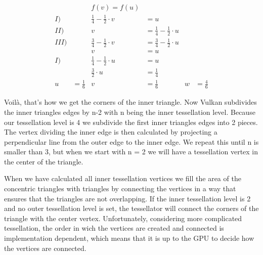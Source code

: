 \documentclass[12pt]{report} \usepackage{preamble}
\begin{document}
\[
	\begin{aligned}
		     &               & f(v)= f(u)                                                                                \\
		I)   &               & \frac{1}{4} - \frac{1}{2}\cdot v & = u                                                    \\
		II)  &               & v                                & = \frac{1}{4} - \frac{1}{2}\cdot u                     \\
		III) &               & \frac{3}{4} -\frac{1}{2}\cdot v  & = \frac{3}{4} -\frac{1}{2}\cdot u                      \\
		     &               & v                                & = u                                                    \\
		I)   &               & \frac{1}{4} - \frac{1}{2}\cdot u & = u                                                    \\
		     &               & \frac{3}{2}\cdot u               & = \frac{1}{4}                                          \\
		u    & = \frac{1}{6} & v                                & = \frac{1}{6}                      & w & = \frac{4}{6}
	\end{aligned}
\]

Voil\`a, that's how we get the corners of the inner triangle.
Now Vulkan subdivides the inner triangles edges by n-2 with n being the
inner tessellation level. Because our tessellation level is 4
we subdivide the first inner triangles edges into 2 pieces.
The vertex dividing the inner edge is then calculated by projecting a
perpendicular line from the outer edge to the inner edge.
We repeat this until n is smaller than 3, but when we start with n = 2
we will have a tessellation vertex in the center of the triangle. \cite{tessellation}

When we have calculated all inner tessellation vertices we fill the area of the
concentric triangles with triangles by connecting the vertices in a way that
ensures that the triangles are not overlapping. If the inner tessellation level is 2 and
no outer tessellation level is set, the tessellator will connect the corners
of the triangle with the center vertex. \cite{tessellation}
Unfortunately, considering more complicated tessellation, the order in wich the vertices
are created and connected is implementation dependent,
which means that it is up to the GPU to decide how the vertices are connected. \cite{tessellation}
\end{document}
